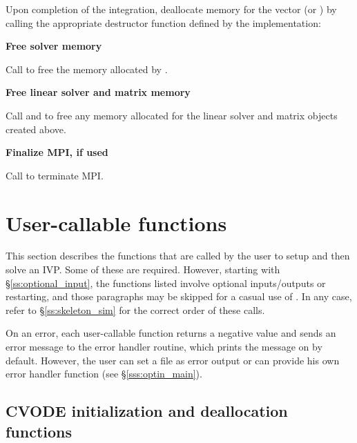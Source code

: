 \begin{Steps}
  Upon completion of the integration, deallocate memory for the vector 
  (or ) by calling the appropriate destructor function defined by the
  {\nvector} implementation:


\item
  {\bf Free solver memory}

  Call  to free the memory allocated by {\cvode}.
  
\item
  {\bf Free linear solver and matrix memory}

  Call  and  to free any memory
  allocated for the linear solver and matrix objects created above.
  
\item 
  {\bf Finalize MPI, if used}

  Call  to terminate MPI.
  
\end{Steps}




\section{User-callable functions}\label{ss:callable_fct_sim}

This section describes the {\cvode} functions that are called by the
user to setup and then solve an IVP. Some of these are required. However,
starting with \S\ref{ss:optional_input}, the functions listed involve
optional inputs/outputs or restarting, and those paragraphs may be
skipped for a casual use of {\cvode}. In any case, refer to
\S\ref{ss:skeleton_sim} for the correct order of these calls.

On an error, each user-callable function returns a negative value and
sends an error message to the error handler routine, which prints the
message on  by default. However, the user can set a file
as error output or can provide his own error handler function (see
\S\ref{sss:optin_main}).

\subsection{CVODE initialization and deallocation functions}
\label{sss:cvodemalloc}

